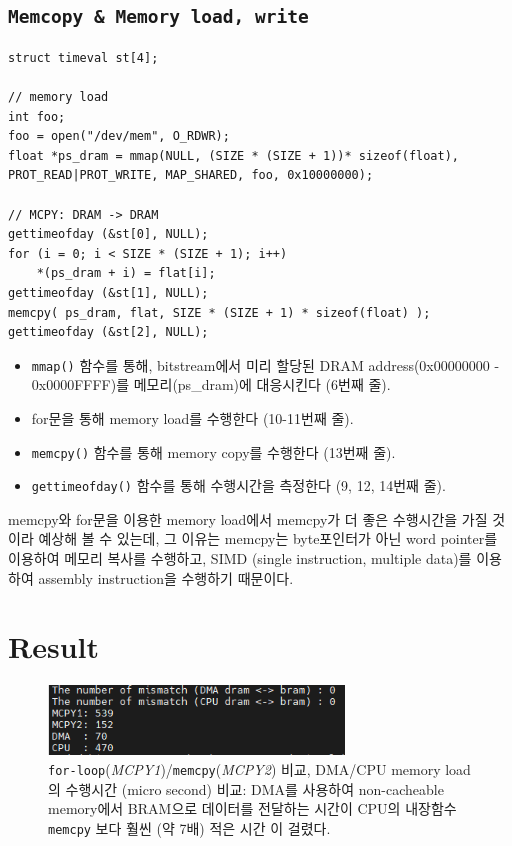 \documentclass{article}
\begin{document}
\subsection*{\texttt{Memcopy \& Memory load, write}}
\begin{lstlisting}[style={c-style}]
struct timeval st[4];

// memory load
int foo;
foo = open("/dev/mem", O_RDWR);
float *ps_dram = mmap(NULL, (SIZE * (SIZE + 1))* sizeof(float), PROT_READ|PROT_WRITE, MAP_SHARED, foo, 0x10000000);

// MCPY: DRAM -> DRAM
gettimeofday (&st[0], NULL);
for (i = 0; i < SIZE * (SIZE + 1); i++)
    *(ps_dram + i) = flat[i];
gettimeofday (&st[1], NULL);
memcpy( ps_dram, flat, SIZE * (SIZE + 1) * sizeof(float) );
gettimeofday (&st[2], NULL);
\end{lstlisting}
\begin{itemize}
  \setlength\itemsep{-0.5em}
    \item  \texttt{mmap()} 함수를 통해, bitstream에서 미리 할당된 DRAM address(0x00000000 - 0x0000FFFF)를 메모리(ps\_dram)에 대응시킨다 (6번째 줄).
    \item for문을 통해 memory load를 수행한다 (10-11번째 줄).
    \item  \texttt{memcpy()} 함수를 통해 memory copy를 수행한다 (13번째 줄).
    \item  \texttt{gettimeofday()} 함수를 통해 수행시간을 측정한다 (9, 12, 14번째 줄).
\end{itemize}
memcpy와 for문을 이용한 memory load에서 memcpy가 더 좋은 수행시간을 가질 것이라 예상해 볼 수 있는데, 그 이유는 memcpy는 byte포인터가 아닌 word pointer를 이용하여 메모리 복사를 수행하고, SIMD (single instruction, multiple data)를 이용하여 assembly instruction을 수행하기 때문이다.

\newpage
\section{Result}
\begin{figure}[htb!]
	\centering
	\includegraphics[width=0.7\textwidth]{fig/make2.png}
\caption{\texttt{for-loop}(\textit{MCPY1})/\texttt{memcpy}(\textit{MCPY2}) 비교, DMA/CPU memory load의 수행시간 (micro second) 비교: DMA를 사용하여 non-cacheable memory에서 BRAM으로 데이터를 전달하는 시간이 CPU의 내장함수 \texttt{memcpy} 보다 훨씬 (약 7배) 적은 시간 이 걸렸다.}
\label{fig5}
\end{figure}
\end{document}
